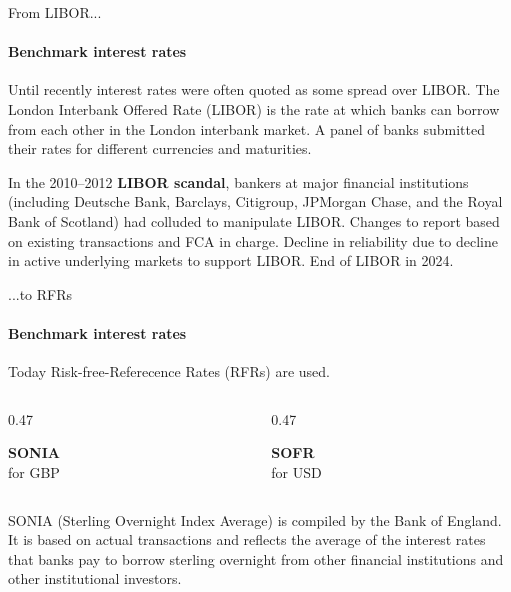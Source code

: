 \documentclass[9pt,aspectratio=169]{beamer}
\newcommand{\keypoint}[1]{%
  \par\noindent
  \begingroup
  \usebeamercolor{keypoint}%
  \setlength{\fboxsep}{7pt}%
  \colorbox{bg}{\parbox{\dimexpr\linewidth-2\fboxsep\relax}{\color{fg}#1}}%
  \endgroup
  \par\medskip}
\begin{document}
\begin{frame}{From LIBOR...}
\framesubtitle{Benchmark interest rates}

Until recently interest rates were often quoted as some spread over LIBOR. The London
Interbank Offered Rate (LIBOR) is the rate at which banks can borrow from each other in
the London interbank market. A panel of banks submitted their rates for different
currencies and maturities.

\vspace{0.7em}
In the 2010--2012 \textbf{LIBOR scandal}, bankers at major financial institutions
(including Deutsche Bank, Barclays, Citigroup, JPMorgan Chase, and the Royal Bank of
Scotland) had colluded to manipulate LIBOR. Changes to report based on existing
transactions and FCA in charge. Decline in reliability due to decline in active underlying
markets to support LIBOR. End of LIBOR in 2024.
\end{frame}

\begin{frame}{...to RFRs}
\framesubtitle{Benchmark interest rates}

Today Risk-free-Referecence Rates (RFRs) are used.

\vspace{0.9em}
\begin{columns}[t]
\begin{column}{0.47\textwidth}
\keypoint{\centering\textbf{\large SONIA}\\[2pt] for GBP}
\end{column}
\begin{column}{0.47\textwidth}
\keypoint{\centering\textbf{\large SOFR}\\[2pt] for USD}
\end{column}
\end{columns}

\vspace{0.5em}
SONIA (Sterling Overnight Index Average) is compiled by the Bank of England. It is based
on actual transactions and reflects the average of the interest rates that banks pay to
borrow sterling overnight from other financial institutions and other institutional
investors.
\end{frame}
\end{document}
